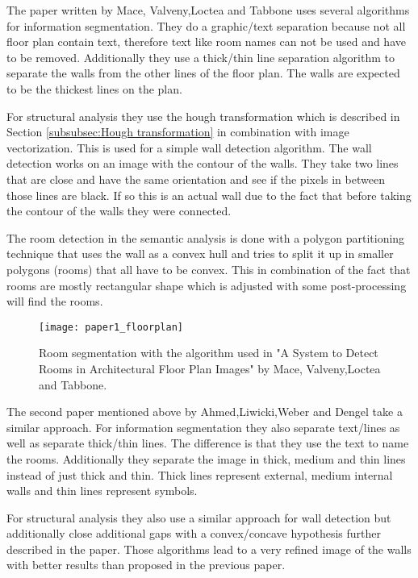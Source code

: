The paper written by Mace, Valveny,Loctea and Tabbone uses several algorithms for information segmentation. They do a graphic/text separation because not all floor plan contain text, therefore text like room names can not be used and have to be removed.  Additionally they use a thick/thin line separation algorithm to separate the walls from the other lines of the floor plan. The walls are expected to be the thickest lines on the plan.

For structural analysis they use the hough transformation which is described in Section \ref{subsubsec:Hough transformation} in combination with image vectorization. This is used for a simple wall detection algorithm. The wall detection works on an image with the contour of the walls. They take two lines that are close and have the same orientation and see if the pixels in between those lines are black. If so this is an actual wall due to the fact that before taking the contour of the walls they were connected. 

The room detection in the semantic analysis is done with a polygon partitioning technique that uses the wall as a convex hull and tries to split it up in smaller polygons (rooms) that all have to be convex. This in combination of the fact that rooms are mostly rectangular shape which is adjusted with some post-processing will find the rooms.

\begin{figure}[h]
	\centering
	\texttt{[image: paper1\_floorplan]}
	\caption{Room segmentation with the algorithm used in "A System to Detect Rooms in Architectural Floor Plan Images" by Mace, Valveny,Loctea and Tabbone. }
	\label{fig:paper1_floorplan}
\end{figure}

The second paper mentioned above by Ahmed,Liwicki,Weber and Dengel take a similar approach. For information segmentation they also separate text/lines as well as separate thick/thin lines. The difference is that they use the text to name the rooms. Additionally they separate the image in thick, medium and thin lines instead of just thick and thin. Thick lines represent external, medium internal walls and thin lines represent symbols.

For structural analysis they also use a similar approach for wall detection but additionally close additional gaps with a convex/concave hypothesis further described in the paper. Those algorithms lead to a very refined image of the walls with better results than proposed in the previous paper.

